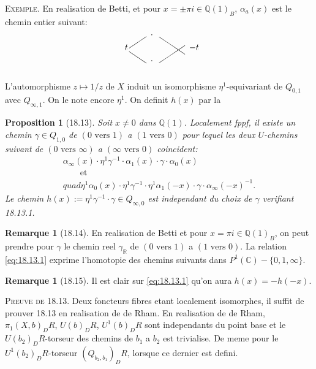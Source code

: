\documentclass[12pt,a4paper]{article}
\theoremstyle{plain}
\newtheorem{proposition}[theorem]{Proposition}
\theoremstyle{definition}
\newtheorem{remark}[theorem]{Remarque}
\theoremstyle{remark}
\newcommand{\Betti}{B}
\newcommand{\dR}{DR}
\newcommand{\QQ}{\mathbb{Q}}
\newcommand{\CC}{\mathbb{C}}
\newcommand{\RR}{\mathbb{R}}
\begin{document}
\noindent \textsc{Exemple.} En realisation de Betti, et pour
$x = \pm \pi i \in \QQ(1)_\Betti$, $\alpha_a(x)$ est le chemin entier
suivant:
\[
\begin{picture}(100,40)
\put(10,20){$t$}
\put(40,35){$\cdot$}
\put(40,5){$\cdot$}
\put(85,20){$-t$}
\put(15,22){$\line(3,2){20}$}
\put(15,18){$\line(3,-2){20}$}
\put(50,35){$\line(3,-2){30}$}
\put(50,5){$\line(3,2){30}$}
\end{picture}
\]

L'automorphisme $z \mapsto 1/z$ de $X$ induit un isomorphisme
$\eta^1$-equivariant de $Q_{0,1}$ avec $Q_{\infty,1}$. On le note
encore $\eta^1$. On definit $h(x)$ par la

\begin{proposition}[18.13]\label{prop:18.13}
Soit $x \neq 0$ dans $\QQ(1)$. Localement fppf, il existe un chemin
$\gamma \in Q_{1,0}$ de $(0 \text{ vers } 1)$ a $(1 \text{ vers } 0)$
pour lequel les deux $U$-chemins suivant de $(0 \text{ vers }
\infty)$ a $(\infty \text{ vers } 0)$ coincident:
\begin{multline}\label{eq:18.13.1}
\alpha_\infty(x) \cdot \eta^1 \gamma^{-1} \cdot \alpha_1(x)
\cdot \gamma \cdot \alpha_0(x) \\
\qquad \text{et} \\quad
\eta^1 \alpha_0(x) \cdot \eta^1 \gamma^{-1} \cdot \eta^1
\alpha_1(-x) \cdot \gamma \cdot \alpha_\infty(-x)^{-1}.
\end{multline}
Le chemin $h(x) := \eta^1 \gamma^{-1} \cdot \gamma \in
Q_{\infty,0}$ est independant du choix de $\gamma$ verifiant
18.13.1.
\end{proposition}

\begin{remark}[18.14]\label{rem:18.14}
En realisation de Betti et pour $x = \pi i \in \QQ(1)_\Betti$, on
peut prendre pour $\gamma$ le chemin reel $\gamma_\RR$ de $(0
\text{ vers } 1)$ a $(1 \text{ vers } 0)$. La relation
\eqref{eq:18.13.1} exprime l'homotopie des chemins suivants dans
$P^1(\CC) - \{0,1,\infty\}$.
\end{remark}

\begin{remark}[18.15]\label{rem:18.15}
Il est clair sur \eqref{eq:18.13.1} qu'on aura $h(x) = -h(-x)$.
\end{remark}

\noindent \textsc{Preuve de 18.13.} Deux foncteurs fibres etant
localement isomorphes, il suffit de prouver 18.13 en realisation de
de Rham. En realisation de de Rham, $\pi_1(X,b)_\dR$, $U(b)_\dR$,
$U^1(b)_\dR$ sont independants du point base et le
$U(b_2)_\dR$-torseur des chemins de $b_1$ a $b_2$ est trivialise. De
meme pour le $U^1(b_2)_\dR$-torseur $(Q_{b_2,b_1})_\dR$, lorsque ce
dernier est defini.
\end{document}
